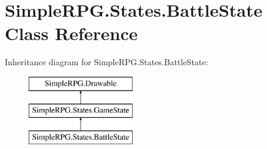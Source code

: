 \hypertarget{class_simple_r_p_g_1_1_states_1_1_battle_state}{\section{Simple\+R\+P\+G.\+States.\+Battle\+State Class Reference}
\label{class_simple_r_p_g_1_1_states_1_1_battle_state}
}
Inheritance diagram for Simple\+R\+P\+G.\+States.\+Battle\+State\+:\begin{figure}[H]
\begin{center}
\leavevmode
\includegraphics[height=3.000000cm]{class_simple_r_p_g_1_1_states_1_1_battle_state}
\end{center}
\end{figure}
